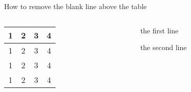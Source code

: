 \documentclass{beamer}
\begin{document}
\begin{frame}[t]{How to remove the blank line above the table}
\begin{columns}[T]
\begin{column}{.6\textwidth}
    \centering
  \begin{tabular}{|c|c|c|c|}\hline
  1&2&3&4 \\ \hline
  1&2&3&4 \\ \hline
  1&2&3&4 \\ \hline
  1&2&3&4 \\ \hline
  \end{tabular}
  \end{column}
  \begin{column}{.4\textwidth}
    the first line 

    the second line
  \end{column}
\end{columns}
\end{frame}
\end{document}
